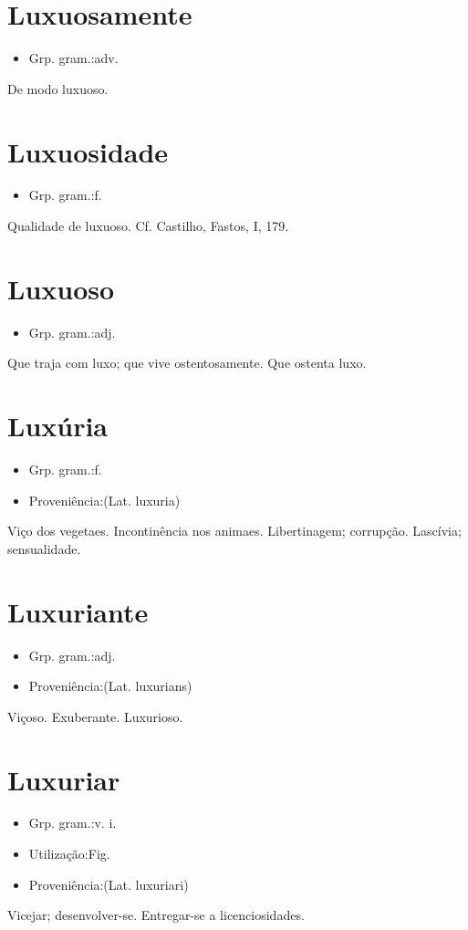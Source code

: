 \section{Luxuosamente}
\begin{itemize}
\item {Grp. gram.:adv.}
\end{itemize}
De modo luxuoso.
\section{Luxuosidade}
\begin{itemize}
\item {Grp. gram.:f.}
\end{itemize}
Qualidade de luxuoso. Cf. Castilho, \textunderscore Fastos\textunderscore , I, 179.
\section{Luxuoso}
\begin{itemize}
\item {Grp. gram.:adj.}
\end{itemize}
Que traja com luxo; que vive ostentosamente.
Que ostenta luxo.
\section{Luxúria}
\begin{itemize}
\item {Grp. gram.:f.}
\end{itemize}
\begin{itemize}
\item {Proveniência:(Lat. \textunderscore luxuria\textunderscore )}
\end{itemize}
Viço dos vegetaes. Incontinência nos animaes.
Libertinagem; corrupção.
Lascívia; sensualidade.
\section{Luxuriante}
\begin{itemize}
\item {Grp. gram.:adj.}
\end{itemize}
\begin{itemize}
\item {Proveniência:(Lat. \textunderscore luxurians\textunderscore )}
\end{itemize}
Viçoso.
Exuberante.
Luxurioso.
\section{Luxuriar}
\begin{itemize}
\item {Grp. gram.:v. i.}
\end{itemize}
\begin{itemize}
\item {Utilização:Fig.}
\end{itemize}
\begin{itemize}
\item {Proveniência:(Lat. \textunderscore luxuriari\textunderscore )}
\end{itemize}
Vicejar; desenvolver-se.
Entregar-se a licenciosidades.
